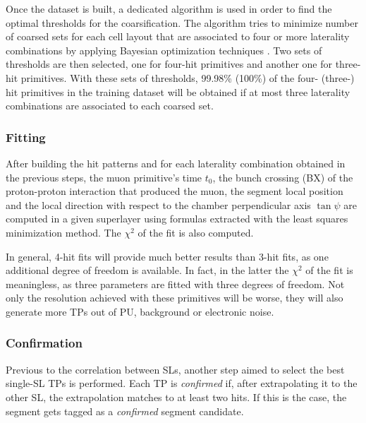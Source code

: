 \documentclass[../main.tex]{subfiles}
\begin{document}
Once the dataset is built, a dedicated algorithm is used in order to find the optimal thresholds for the coarsification. The algorithm tries to minimize number of coarsed sets for each cell layout that are associated to four or more laterality combinations by applying Bayesian optimization techniques \cite{dts:bayes, dts:bayes_python}. Two sets of thresholds are then selected, one for four-hit primitives and another one for three-hit primitives. With these sets of thresholds, 99.98\% (100\%) of the four- (three-) hit primitives in the training dataset will be obtained if at most three laterality combinations are associated to each coarsed set.


\subsubsection*{Fitting}

After building the hit patterns and for each laterality combination obtained in the previous steps, the muon primitive's time $t_0$, the bunch crossing (BX) of the proton-proton interaction that produced the muon, the segment local position and the local direction with respect to the chamber perpendicular axis $\tan\psi$ are computed in a given superlayer using formulas extracted with the least squares minimization method. The $\chi^2$ of the fit is also computed.

In general, 4-hit fits will provide much better results than 3-hit fits, as one additional degree of freedom is available. In fact, in the latter the $\chi^2$ of the fit is meaningless, as three parameters are fitted with three degrees of freedom. Not only the resolution achieved with these primitives will be worse, they will also generate more TPs out of PU, background or electronic noise.


\subsubsection*{Confirmation}

Previous to the correlation between SLs, another step aimed to select the best single-SL TPs is performed. Each TP is \textit{confirmed} if, after extrapolating it to the other SL, the extrapolation matches to at least two hits. If this is the case, the segment gets tagged as a \textit{confirmed} segment candidate.
\end{document}
